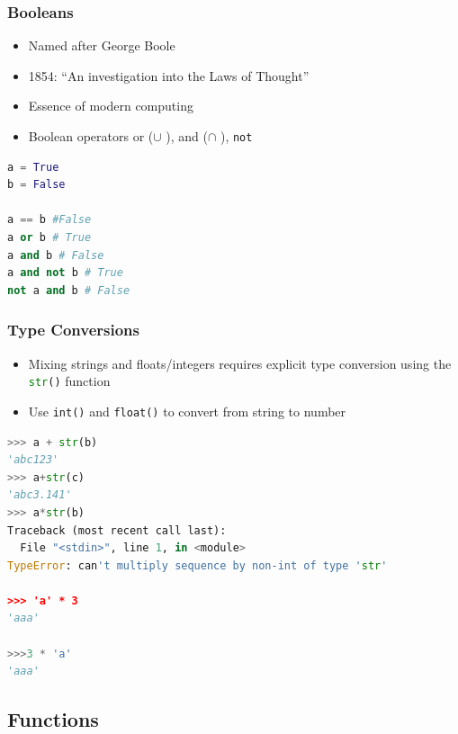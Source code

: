 \documentclass[english]{beamer}
\begin{document}
\begin{frame}[containsverbatim]
\frametitle{Booleans}

\begin{itemize}
	\item Named after George Boole
	\item 1854: \enquote{An investigation into the Laws of Thought}
	\item Essence of modern computing
	\item Boolean operators or ($\cup$ ),  and ($\cap$ ), \texttt{not}
\end{itemize}

\begin{lstlisting}[language={Python}]
a = True
b = False 

a == b #False
a or b # True
a and b # False
a and not b # True
not a and b # False
\end{lstlisting}
\end{frame}



\begin{frame}[containsverbatim]
\frametitle{Type Conversions}

\begin{itemize}
\item Mixing strings and floats/integers requires explicit type conversion using the \lstinline[language={Python}]{str()} function
\item Use \texttt{int()} and \texttt{float()} to convert from string to number
\end{itemize}

\begin{lstlisting}[language={Python}]
>>> a + str(b)
'abc123'
>>> a+str(c)
'abc3.141'
>>> a*str(b)
Traceback (most recent call last):
  File "<stdin>", line 1, in <module>
TypeError: can't multiply sequence by non-int of type 'str'

>>> 'a' * 3
'aaa'

>>>3 * 'a'
'aaa'
\end{lstlisting}


\end{frame}

\subsection{Functions}
\end{document}
